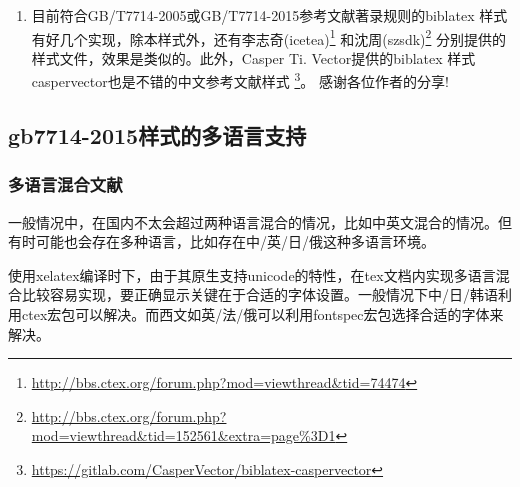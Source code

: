 \begin{enumerate}

  \item 目前符合GB/T7714-2005或GB/T7714-2015参考文献著录规则的biblatex 样式有好几个实现，除本样式外，还有李志奇(icetea)\footnote{\url{http://bbs.ctex.org/forum.php?mod=viewthread&tid=74474}} 和沈周(szsdk)\footnote{\url{http://bbs.ctex.org/forum.php?mod=viewthread&tid=152561&extra=page\%3D1}} 分别提供的样式文件，效果是类似的。此外，Casper Ti. Vector提供的biblatex 样式caspervector也是不错的中文参考文献样式
      \footnote{\url{https://gitlab.com/CasperVector/biblatex-caspervector}}。 感谢各位作者的分享!

%
%
%
%

\end{enumerate}





\subsection{gb7714-2015样式的多语言支持}\label{sec:multilan:implement}

\subsubsection{多语言混合文献}

一般情况中，在国内不太会超过两种语言混合的情况，比如中英文混合的情况。但有时可能也会存在多种语言，比如存在中/英/日/俄这种多语言环境。

使用xelatex编译时下，由于其原生支持unicode的特性，在tex文档内实现多语言混合比较容易实现，要正确显示关键在于合适的字体设置。一般情况下中/日/韩语利用ctex宏包可以解决。而西文如英/法/俄可以利用fontspec宏包选择合适的字体来解决。

